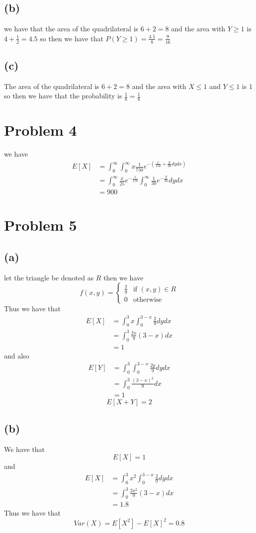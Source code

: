 \subsection*{(b)}
we have that the area of the quadrilateral is $6+2=8$ and
the area with $Y\geq 1$ is $4+\frac{1}{2}=4.5$ so then we have that 
$P(Y\geq 1)=\frac{4.5}{8}=\boxed{\frac{9}{16}}$
\subsection*{(c)}
The area of the quadrilateral is $6+2=8$ and the area with $X\leq 1$ and $Y\leq 1$ is $1$ so then we have that
the probability is $\frac{1}{8}=\boxed{\frac{1}{8}}$
\section*{Problem 4}
we have 
\begin{align*}
    E[X]&=\int_{0}^{\infty}\int_{0}^{\infty}x\frac{1}{750}e^{-\left(\frac{x}{150}+\frac{y}{30}dydx\right)}\\
    &=\int_{0}^{\infty}\frac{x}{25}e^{-\frac{x}{150}}\int_{0}^{\infty}\frac{1}{30}e^{-\frac{y}{30}}dydx\\
    &=\boxed{900}
\end{align*}
\section*{Problem 5}
\subsection*{(a)}
let the triangle be denoted as $R$ then we have
$$f(x,y)=\begin{cases}
    \frac{2}{9} & \text{if } (x,y)\in R\\
    0 & \text{otherwise}
\end{cases}$$
Thus we have that
\begin{align*}
    E[X]&=\int_{0}^{3}x\int_{0}^{3-x}\frac{2}{9}dydx\\
    &=\int_{0}^{3}\frac{2x}{9}(3-x)dx\\
    &=\boxed{1}
\end{align*}
and also
\begin{align*}
    E[Y]&=\int_{0}^{3}\int_{0}^{3-x}\frac{2y}{9}dydx\\
    &=\int_{0}^{3}\frac{(3-x)^2}{9}dx\\
    &=\boxed{1}
\end{align*}
$$E[X+Y]=\boxed{2}$$
\subsection*{(b)}
We have that 
$$E[X]=1$$
and 
\begin{align*}
    E[X]&=\int_{0}^{3}x^2\int_{0}^{3-x}\frac{2}{9}dydx\\
    &=\int_{0}^{3}\frac{2x^2}{9}(3-x)dx\\
    &=\boxed{1.8}
\end{align*}
Thus we have that
$$Var(X)=E[X^2]-E[X]^2=\boxed{0.8}$$
